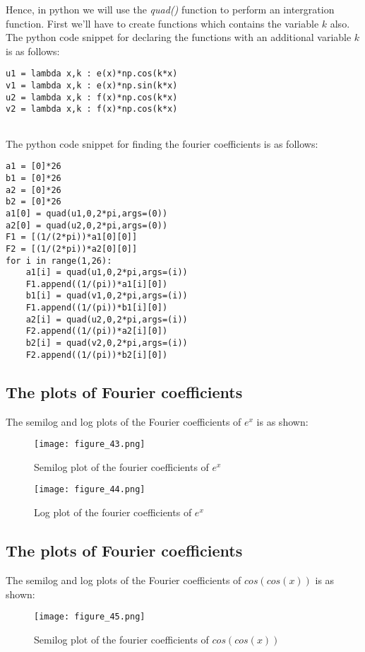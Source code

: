 \documentclass[11pt, a4paper, twoside]{article}
\begin{document}
Hence, in python we will use the \textit{quad()} function to perform an intergration function. First we'll have to create functions which contains the variable $k$ also. The python code snippet for declaring the functions with an additional variable $k$ is as follows:
\begin{verbatim}
u1 = lambda x,k : e(x)*np.cos(k*x)
v1 = lambda x,k : e(x)*np.sin(k*x)
u2 = lambda x,k : f(x)*np.cos(k*x)
v2 = lambda x,k : f(x)*np.cos(k*x)
	
\end{verbatim}
The python code snippet for finding the fourier coefficients is as follows:
\begin{verbatim}
a1 = [0]*26 
b1 = [0]*26
a2 = [0]*26
b2 = [0]*26
a1[0] = quad(u1,0,2*pi,args=(0))  
a2[0] = quad(u2,0,2*pi,args=(0))
F1 = [(1/(2*pi))*a1[0][0]]
F2 = [(1/(2*pi))*a2[0][0]]
for i in range(1,26):
    a1[i] = quad(u1,0,2*pi,args=(i))
    F1.append((1/(pi))*a1[i][0])
    b1[i] = quad(v1,0,2*pi,args=(i))
    F1.append((1/(pi))*b1[i][0])
    a2[i] = quad(u2,0,2*pi,args=(i))
    F2.append((1/(pi))*a2[i][0])
    b2[i] = quad(v2,0,2*pi,args=(i))
    F2.append((1/(pi))*b2[i][0])
\end{verbatim}

\subsection{The plots of Fourier coefficients}
The semilog and log plots of the Fourier coefficients of  $e^{x}$ is as shown:

	\begin{figure}[!tbh]
   	\centering 
   	\texttt{[image: figure\_43.png]}   
   	\caption{Semilog plot of the fourier coefficients of $e^{x}$}
   	\label{fig:sample}
   \end{figure} 

	\begin{figure}[!tbh]
   	\centering
   	\texttt{[image: figure\_44.png]}   
   	\caption{Log plot of the fourier coefficients of $e^{x}$}
   \end{figure}
   \newpage
\subsection{The plots of Fourier coefficients}
The semilog and log plots of the Fourier coefficients of  $cos(cos(x))$ is as shown:
	\begin{figure}[!tbh]
   	\centering
   	\texttt{[image: figure\_45.png]}   
   	\caption{Semilog plot of the fourier coefficients of $cos(cos(x))$}
   	\label{fig:sample}
   \end{figure} 
\end{document}
